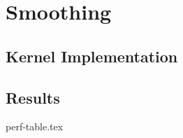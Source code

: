 \documentclass[final]{report}
\begin{document}
\chapter{Smoothing}

\section{Kernel Implementation}



\section{Results}
{perf-table.tex}
\end{document}
